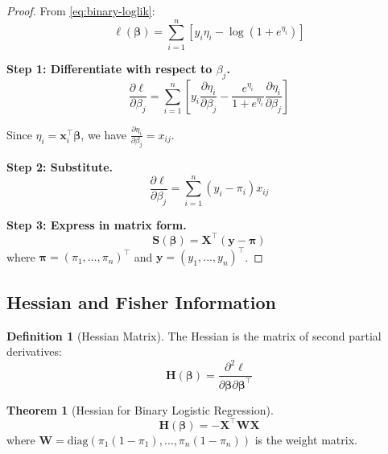 \documentclass[11pt,letterpaper]{article}
\theoremstyle{definition}
\newtheorem{definition}{Definition}[section]
\newtheorem{theorem}{Theorem}[section]
\newcommand{\X}{\mathbf{X}}
\newcommand{\y}{\mathbf{y}}
\newcommand{\bb}{\boldsymbol{\beta}}
\newcommand{\pp}{\boldsymbol{\pi}}
\newcommand{\W}{\mathbf{W}}
\newcommand{\diag}{\mathrm{diag}}
\begin{document}
\begin{proof}
From \eqref{eq:binary-loglik}:
\begin{equation}
    \ell(\bb) = \sum_{i=1}^{n} \left[ y_i \eta_i - \log(1 + e^{\eta_i}) \right]
\end{equation}

\textbf{Step 1: Differentiate with respect to $\beta_j$.}
\begin{equation}
    \frac{\partial \ell}{\partial \beta_j} = \sum_{i=1}^{n} \left[ y_i \frac{\partial \eta_i}{\partial \beta_j} - \frac{e^{\eta_i}}{1 + e^{\eta_i}} \frac{\partial \eta_i}{\partial \beta_j} \right]
\end{equation}

Since $\eta_i = \mathbf{x}_i^\top \bb$, we have $\frac{\partial \eta_i}{\partial \beta_j} = x_{ij}$.

\textbf{Step 2: Substitute.}
\begin{equation}
    \frac{\partial \ell}{\partial \beta_j} = \sum_{i=1}^{n} (y_i - \pi_i) x_{ij}
\end{equation}

\textbf{Step 3: Express in matrix form.}
\begin{equation}
    \mathbf{S}(\bb) = \X^\top (\y - \pp)
\end{equation}
where $\pp = (\pi_1, \ldots, \pi_n)^\top$ and $\y = (y_1, \ldots, y_n)^\top$.
\end{proof}

\subsection{Hessian and Fisher Information}

\begin{definition}[Hessian Matrix]
The Hessian is the matrix of second partial derivatives:
\begin{equation}
    \mathbf{H}(\bb) = \frac{\partial^2 \ell}{\partial \bb \partial \bb^\top}
\end{equation}
\end{definition}

\begin{theorem}[Hessian for Binary Logistic Regression]
\begin{equation}
    \mathbf{H}(\bb) = -\X^\top \W \X
    \label{eq:hessian}
\end{equation}
where $\W = \diag(\pi_1(1-\pi_1), \ldots, \pi_n(1-\pi_n))$ is the weight matrix.
\end{theorem}
\end{document}
